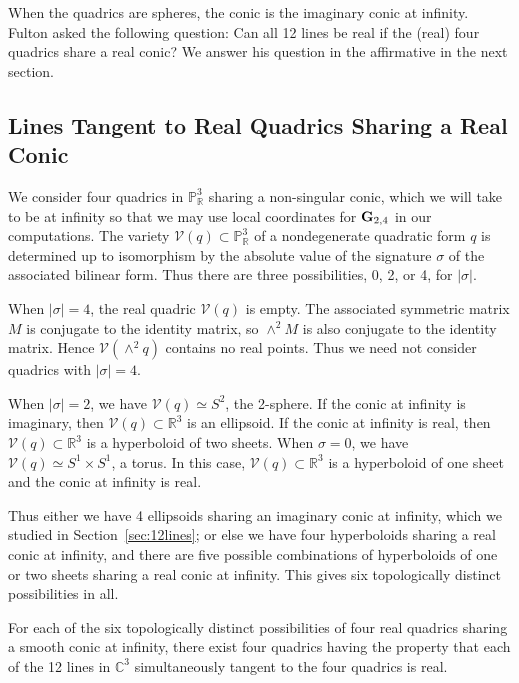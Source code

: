 When the quadrics are spheres, the conic is the imaginary conic at infinity.
Fulton asked the following question:
Can all 12 lines be real if the (real) four quadrics share a real conic?
We answer his question in the affirmative in the next section.


\subsection{Lines Tangent to Real Quadrics Sharing a Real Conic}
We consider four quadrics in ${\mathbb P}^3_{\mathbb R}$ sharing a
non-singular conic, which we will take to be at infinity so that we may use
local coordinates for ${\bf G}_{2,4}$ in our computations.
The variety ${\mathcal V}(q)\subset{\mathbb P}^3_{\mathbb R}$ of a
nondegenerate quadratic form $q$ is determined up to isomorphism by the
absolute value of the signature $\sigma$ of the
associated bilinear form. 
Thus there are three possibilities, 0, 2, or 4, for $|\sigma|$.

When $|\sigma|=4$, the real quadric ${\mathcal V}(q)$ is empty.
The associated symmetric matrix $M$ is conjugate to the identity
matrix, so $\wedge^2M$ is also conjugate to the identity matrix.
Hence ${\mathcal V}(\wedge^2q)$ contains no real points.
Thus we need not consider quadrics with $|\sigma|=4$.

When $|\sigma|=2$, we have ${\mathcal V}(q)\simeq S^2$, the 2-sphere.
If the conic at infinity is imaginary, then 
${\mathcal V}(q)\subset{\mathbb R}^3$ is an ellipsoid.
If the conic at infinity is real, then ${\mathcal V}(q)\subset{\mathbb R}^3$ is 
a hyperboloid of two sheets.
When $\sigma=0$, we have ${\mathcal V}(q)\simeq S^1\times S^1$, a torus.
In this case, ${\mathcal V}(q)\subset{\mathbb R}^3$ is 
a hyperboloid of one sheet and the conic at infinity is real.

Thus either we have 4 ellipsoids sharing an imaginary conic at infinity,
which we studied in Section~\ref{sec:12lines}; or else we have four
hyperboloids sharing a real conic at infinity, and there are five 
possible combinations of hyperboloids of one or two sheets sharing a real
conic at infinity.
This gives six topologically distinct possibilities in all.


\begin{theorem}
For each of the six topologically distinct possibilities of four real
quadrics sharing a smooth conic at infinity, there exist four quadrics
having the property that each of the 12 lines in ${\mathbb C}^3$
simultaneously tangent to the four quadrics is real.
\end{theorem}

